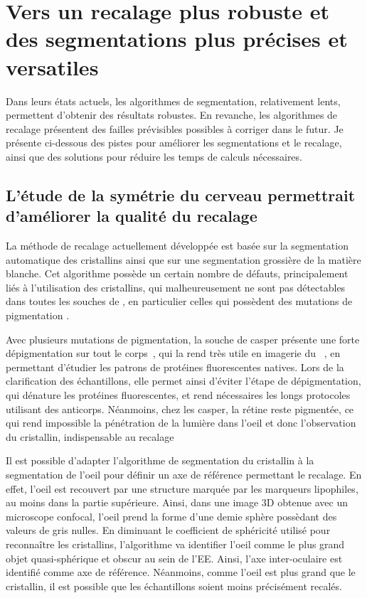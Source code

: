 \documentclass[\main/main.tex]{subfiles}
\begin{document}
                    
\section{Vers un recalage plus robuste et des segmentations plus précises et versatiles}

%
Dans leurs états actuels, les algorithmes de segmentation, relativement lents, permettent d'obtenir des résultats robustes. En revanche, les algorithmes de recalage présentent des failles prévisibles possibles à corriger dans le futur.
Je présente ci-dessous des pistes pour améliorer les segmentations et le recalage,
ainsi que des solutions pour réduire les temps de calculs nécessaires.

    \subsection{L'étude de la symétrie du cerveau permettrait d'améliorer la qualité du recalage}
 
%   
La méthode de recalage actuellement développée est basée sur la segmentation automatique des cristallins ainsi que sur une segmentation grossière de la matière blanche. Cet algorithme possède un certain nombre de défauts, principalement liés à l'utilisation des cristallins, qui malheureusement ne sont pas détectables dans toutes les souches de \pz{}, en particulier celles qui possèdent des mutations de pigmentation .

%
Avec plusieurs mutations de pigmentation, la souche de \pz{} casper présente une forte dépigmentation sur tout le corps~\cite{white_2008}, qui la rend très utile en imagerie du \pz~\cite{hecker_2020,camiolo_2020, wertman_2020}, en permettant d'étudier les patrons de protéines fluorescentes natives. Lors de la clarification des échantillons, elle permet ainsi d'éviter  l'étape de dépigmentation, qui dénature les protéines fluorescentes, et rend  nécessaires les longs protocoles utilisant des anticorps.   Néanmoins, chez les casper, la rétine reste pigmentée, ce qui rend impossible la pénétration de la lumière dans l'oeil et donc l'observation du cristallin, indispensable au recalage

%
Il est possible d'adapter l'algorithme de segmentation du cristallin à la segmentation de l'oeil pour définir un axe de référence permettant le recalage. En effet, l'oeil est recouvert par une structure marquée par les marqueurs lipophiles, au moins dans la partie supérieure. Ainsi, dans une image 3D obtenue avec un microscope confocal, l'oeil prend la forme d'une demie sphère possèdant des valeurs de gris nulles. En diminuant le coefficient de sphéricité utilisé  pour reconnaître les cristallins, l'algorithme va identifier l'oeil comme le plus grand objet quasi-sphérique et obscur au sein de l'EE.
Ainsi, l'axe inter-oculaire est identifié comme axe de référence. Néanmoins, comme l'oeil est plus grand que le cristallin, il est possible que les échantillons soient moins précisément recalés.
\end{document}

